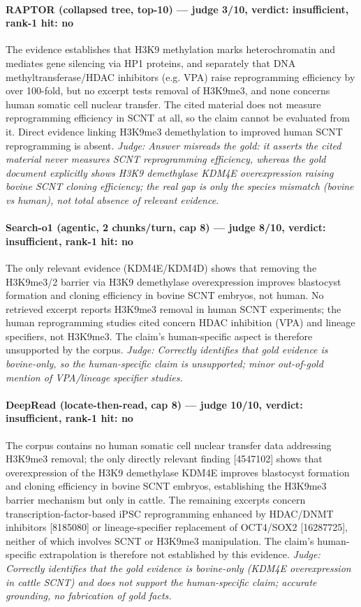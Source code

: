 \documentclass[sigconf, review, anonymous]{acmart}
\begin{document}
\paragraph{RAPTOR (collapsed tree, top-10) --- judge 3/10, verdict: insufficient, rank-1 hit: no}
\noindent The evidence establishes that H3K9 methylation marks heterochromatin and mediates gene silencing via HP1 proteins, and separately that DNA methyltransferase/HDAC inhibitors (e.g. VPA) raise reprogramming efficiency by over 100-fold, but no excerpt tests removal of H3K9me3, and none concerns human somatic cell nuclear transfer. The cited material does not measure reprogramming efficiency in SCNT at all, so the claim cannot be evaluated from it. Direct evidence linking H3K9me3 demethylation to improved human SCNT reprogramming is absent.
\noindent\small\textit{Judge: Answer misreads the gold: it asserts the cited material never measures SCNT reprogramming efficiency, whereas the gold document explicitly shows H3K9 demethylase KDM4E overexpression raising bovine SCNT cloning efficiency; the real gap is only the species mismatch (bovine vs human), not total absence of relevant evidence.}
\paragraph{Search-o1 (agentic, 2 chunks/turn, cap 8) --- judge 8/10, verdict: insufficient, rank-1 hit: no}
\noindent The only relevant evidence (KDM4E/KDM4D) shows that removing the H3K9me3/2 barrier via H3K9 demethylase overexpression improves blastocyst formation and cloning efficiency in bovine SCNT embryos, not human. No retrieved excerpt reports H3K9me3 removal in human SCNT experiments; the human reprogramming studies cited concern HDAC inhibition (VPA) and lineage specifiers, not H3K9me3. The claim's human-specific aspect is therefore unsupported by the corpus.
\noindent\small\textit{Judge: Correctly identifies that gold evidence is bovine-only, so the human-specific claim is unsupported; minor out-of-gold mention of VPA/lineage specifier studies.}
\paragraph{DeepRead (locate-then-read, cap 8) --- judge 10/10, verdict: insufficient, rank-1 hit: no}
\noindent The corpus contains no human somatic cell nuclear transfer data addressing H3K9me3 removal; the only directly relevant finding [4547102] shows that overexpression of the H3K9 demethylase KDM4E improves blastocyst formation and cloning efficiency in bovine SCNT embryos, establishing the H3K9me3 barrier mechanism but only in cattle. The remaining excerpts concern transcription-factor-based iPSC reprogramming enhanced by HDAC/DNMT inhibitors [8185080] or lineage-specifier replacement of OCT4/SOX2 [16287725], neither of which involves SCNT or H3K9me3 manipulation. The claim's human-specific extrapolation is therefore not established by this evidence.
\noindent\small\textit{Judge: Correctly identifies that the gold evidence is bovine-only (KDM4E overexpression in cattle SCNT) and does not support the human-specific claim; accurate grounding, no fabrication of gold facts.}
\end{document}
